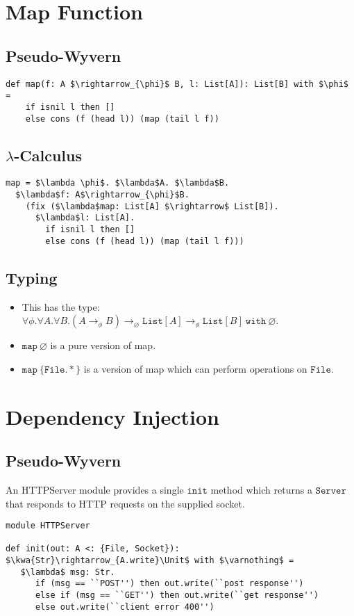 \documentclass{llncs}
\newcommand{\keywadj}[1]{\mathtt{#1}}
\newcommand{\keyw}[1]{\keywadj{#1}~}
\newcommand{\kw}[1]{\keyw{ #1 }}
\newcommand{\kwa}[1]{\keywadj{ #1 }}
\newcommand{\Unit}[0]{ \kwa{Unit} }
\begin{document}
\section{Map Function}

\subsection*{Pseudo-Wyvern}
\begin{lstlisting}
def map(f: A $\rightarrow_{\phi}$ B, l: List[A]): List[B] with $\phi$ =
	if isnil l then []
	else cons (f (head l)) (map (tail l f))
\end{lstlisting}

\subsection*{$\lambda$-Calculus}
\begin{lstlisting}
map = $\lambda \phi$. $\lambda$A. $\lambda$B.
  $\lambda$f: A$\rightarrow_{\phi}$B.
    (fix ($\lambda$map: List[A] $\rightarrow$ List[B]).
      $\lambda$l: List[A].
        if isnil l then []
        else cons (f (head l)) (map (tail l f)))
\end{lstlisting}

\subsection*{Typing}

\begin{itemize}
	\item This has the type: $\forall \phi. \forall A. \forall B. (A \rightarrow_{\phi} B)  \rightarrow_{\varnothing} \kwa{List}[A] \rightarrow_{\phi} \kwa{List}[B]~ \kw{with} \varnothing$.
	\item $\kwa{map}~\varnothing$ is a pure version of map.
	\item $\kwa{map}~\{ \kwa{File.*} \}$ is a version of map which can perform operations on $\kwa{File}$.
\end{itemize}

\section{Dependency Injection}

\subsection*{Pseudo-Wyvern}

An HTTPServer module provides a single $\kwa{init}$ method which returns a $\kwa{Server}$ that responds to HTTP requests on the supplied socket.
\begin{lstlisting}
module HTTPServer

def init(out: A <: {File, Socket}): $\kwa{Str}\rightarrow_{A.write}\Unit$ with $\varnothing$ =
   $\lambda$ msg: Str.
      if (msg == ``POST'') then out.write(``post response'')
      else if (msg == ``GET'') then out.write(``get response'')
      else out.write(``client error 400'')
\end{lstlisting}
\end{document}
